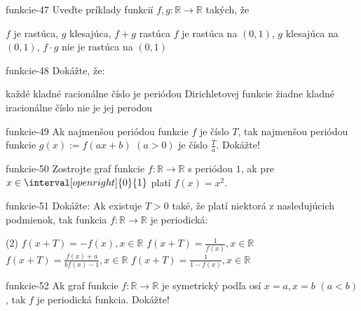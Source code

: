\begin{defproblem}{funkcie-47}
Uveďte príklady funkcií $f,g:\mathbb{R}\rightarrow\mathbb{R}$ takých, že
\begin{tasks}
\task
  $f$ je rastúca, $g$ klesajúca, $f+g$ rastúca
\task
  $f$ je rastúca na $(0,1)$, $g$ klesajúca na $(0,1)$, $f\cdot g$ nie je
  rastúca na $(0,1)$
\end{tasks}
\end{defproblem}

\begin{defproblem}{funkcie-48}
Dokážte, že:
\begin{tasks}
\task každé kladné racionálne číslo je periódou Dirichletovej funkcie
\task žiadne kladné iracionálne číslo nie je jej perodou
\end{tasks}
\end{defproblem}

\begin{defproblem}{funkcie-49}
Ak najmenšou periódou funkcie $f$ je číslo $T$, tak najmenšou periódou funkcie
$g(x):=f(ax+b)$ $(a>0)$ je číslo $\frac{T}{a}$. Dokážte!
\end{defproblem}

\begin{defproblem}{funkcie-50}
Zostrojte graf funkcie $f:\mathbb{R} \rightarrow \mathbb{R}$ s periódou $1$, ak
pre $x \in \interval[open right]{0}{1}$ platí $f(x) = x^2$.
\end{defproblem}

\begin{defproblem}{funkcie-51}
Dokážte: Ak existuje $T>0$ také, že platí niektorá z nasledujúcich podmienok,
tak funkcia $f:\mathbb{R} \rightarrow \mathbb{R}$ je periodická:
\begin{tasks}(2)
  \task $f(x+T)=-f(x),x\in\mathbb{R}$
  \task $f(x+T)=\frac{1}{f(x)},x\in\mathbb{R}$
  \task $f(x+T)=\frac{f(x)+a}{bf(x)-1},x\in\mathbb{R}$
  \task $f(x+T)=\frac{1}{1-f(x)},x\in\mathbb{R}$
\end{tasks}
\end{defproblem}

\begin{defproblem}{funkcie-52}
Ak graf funkcie $f:\mathbb{R} \rightarrow \mathbb{R}$ je symetrický podľa osí
$x = a,x = b$ $(a < b)$, tak $f$ je periodická funkcia. Dokážte!
\end{defproblem}


